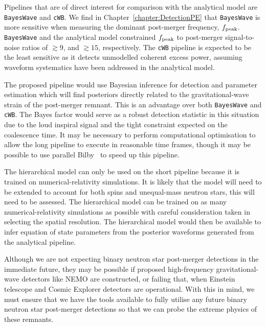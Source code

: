 \documentclass[../Thesis.tex]{subfiles}
\begin{document}
    Pipelines that are of direct interest for comparison with the analytical model are \texttt{BayesWave} and  \texttt{cWB}.
    We find in Chapter~\ref{chapter:DetectionPE} that \texttt{BayesWave} is more sensitive when measuring the dominant post-merger frequency, $f_{\mathrm{peak}}$.
    \texttt{BayesWave} and the analytical model constrained $f_{\mathrm{peak}}$ to post-merger signal-to-noise ratios of $\gtrsim 9$, and $\gtrsim 15$, respectively. 
    The \texttt{cWB} pipeline is expected to be the least sensitive as it detects unmodelled coherent excess power, assuming waveform systematics have been addressed in the analytical model. \par

    The proposed pipeline would use Bayesian inference for detection and parameter estimation which will find posteriors directly related to the gravitational-wave strain of the post-merger remnant.
    This is an advantage over both \texttt{BayesWave} and \texttt{cWB}. 
    The Bayes factor would serve as a robust detection statistic in this situation due to the loud inspiral signal and the tight constraint expected on the coalescence time.
    It may be necessary to perform computational optimisation to allow the long pipeline to execute in reasonable time frames, though it may be possible to use parallel Bilby~\cite{Smith2020} to speed up this pipeline. \par
    
    The hierarchical model can only be used on the short pipeline because it is trained on numerical-relativity simulations.
    It is likely that the model will need to be extended to account for both spins and unequal-mass neutron stars, this will need to be assessed.
    The hierarchical model can be trained on as many numerical-relativity simulations as possible with careful consideration taken in selecting the spatial resolution.
    The hierarchical model would then be available to infer equation of state parameters from the posterior waveforms generated from the analytical pipeline.
\par
    Although we are not expecting binary neutron star post-merger detections in the immediate future, they may be possible if proposed high-frequency gravitational-wave detectors like NEMO are constructed, or failing that, when Einstein telescope and Cosmic Explorer detectors are operational.
    With this in mind, we must ensure that we have the tools available to fully utilise any future binary neutron star post-merger detections so that we can probe the extreme physics of these remnants.

    \par
    



    

    
\end{document}
